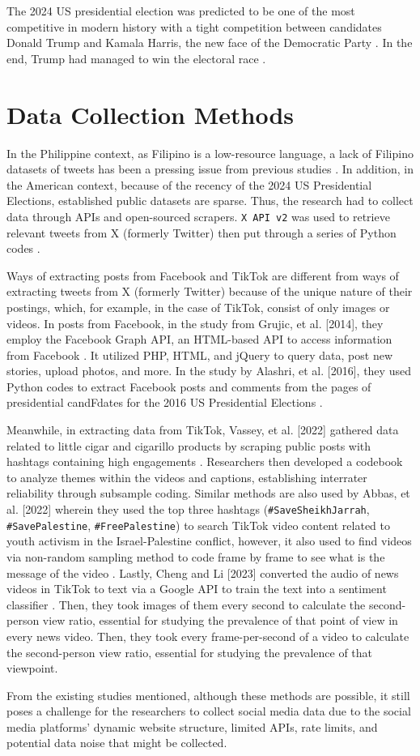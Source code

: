 The 2024 US presidential election was predicted to be one of the most competitive in modern history with a tight competition between candidates Donald Trump and Kamala Harris, the new face of the Democratic Party \cite{RRL_Setiawan-2025}. In the end, Trump had managed to win the electoral race \cite{RRL_Setiawan-2025}.

\section{Data Collection Methods}
In the Philippine context, as Filipino is a low-resource language, a lack of Filipino datasets of tweets has been a pressing issue from previous studies \cite{RRL_Aquino-2025}. In addition, in the American context, because of the recency of the 2024 US Presidential Elections, established public datasets are sparse. Thus, the research had to collect data through APIs and open-sourced scrapers. \texttt{X API v2} was used to retrieve relevant tweets from X (formerly Twitter) then put through a series of Python codes \cite{RRL_Ancheta-2020}.

Ways of extracting posts from Facebook and TikTok are different from ways of extracting tweets from X (formerly Twitter) because of the unique nature of their postings, which, for example, in the case of TikTok, consist of only images or videos. In posts from Facebook, in the study from Grujic, et al. [2014], they employ the Facebook Graph API, an HTML-based API to access information from Facebook \cite{RRL_Grujic-2014}. It utilized PHP, HTML, and jQuery to query data, post new stories, upload photos, and more. In the study by Alashri, et al. [2016], they used Python codes to extract Facebook posts and comments from the pages of presidential candFdates for the 2016 US Presidential Elections \cite{RRL_Alashri-2016}.

Meanwhile, in extracting data from TikTok, Vassey, et al. [2022] gathered data related to little cigar and cigarillo products by scraping public posts with hashtags containing high engagements \cite{RRL_Vassey-2022}. Researchers then developed a codebook to analyze themes within the videos and captions, establishing interrater reliability through subsample coding. Similar methods are also used by Abbas, et al. [2022] wherein they used the top three hashtags (\texttt{\#SaveSheikhJarrah}, \texttt{\#SavePalestine}, \texttt{\#FreePalestine}) to search TikTok video content related to youth activism in the Israel-Palestine conflict, however, it also used to find videos via non-random sampling method to code frame by frame to see what is the message of the video \cite{RRL_Abbas-2022}. Lastly, Cheng and Li [2023] converted the audio of news videos in TikTok to text via a Google API to train the text into a sentiment classifier \cite{RRL_Cheng-2024}. Then, they took images of them every second to calculate the second-person view ratio, essential for studying the prevalence of that point of view in every news video. Then, they took every frame-per-second of a video to calculate the second-person view ratio, essential for studying the prevalence of that viewpoint.

From the existing studies mentioned, although these methods are possible, it still poses a challenge for the researchers to collect social media data due to the social media platforms’ dynamic website structure, limited APIs, rate limits, and potential data noise that might be collected.